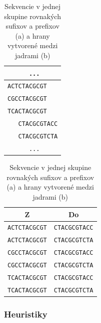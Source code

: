 \begin{table}
    \begin{subtable}{.5\linewidth}
        \centering
\begin{tabular}{ c }
    \verb|      ...     | \\
	\hline
	\color{red}     \verb|ACTCTACGCGT   | \\
	\color{green}   \verb|CGCCTACGCGT   | \\
	\color{blue}    \verb|TCACTACGCGT   | \\
	\color{cyan}    \verb|   CTACGCGTACC| \\
	\color{magenta} \verb|   CTACGCGTCTA| \\
	\hline
    \verb|      ...     | \\
\end{tabular}
        \caption{}
        \label{subtable:skupina_suf_pref}
    \end{subtable}
    \begin{subtable}{.5\linewidth}
        \centering
        \begin{tabular}{ c c }
        	\hline
           	Z & Do \\ \hline \hline
           	 \color{red}    \verb|ACTCTACGCGT| & \color{cyan}    \verb|CTACGCGTACC| \\
           	 \color{red}    \verb|ACTCTACGCGT| & \color{magenta} \verb|CTACGCGTCTA| \\
           	 \color{green}  \verb|CGCCTACGCGT| & \color{cyan}    \verb|CTACGCGTACC| \\
           	 \color{green}  \verb|CGCCTACGCGT| & \color{magenta} \verb|CTACGCGTCTA| \\
           	 \color{blue}   \verb|TCACTACGCGT| & \color{cyan}    \verb|CTACGCGTACC| \\
           	 \color{blue}   \verb|TCACTACGCGT| & \color{magenta} \verb|CTACGCGTCTA| \\
           	 \hline
        \end{tabular}
        \caption{}
        \label{subtable:vytvorene_hrany}
    \end{subtable}
    \caption{Sekvencie v jednej skupine rovnakých sufixov a prefixov (a) a hrany vytvorené medzi jadrami (b)}
    \label{table:prekrytia_jadier}
\end{table}

\subsubsection{Heuristiky}

